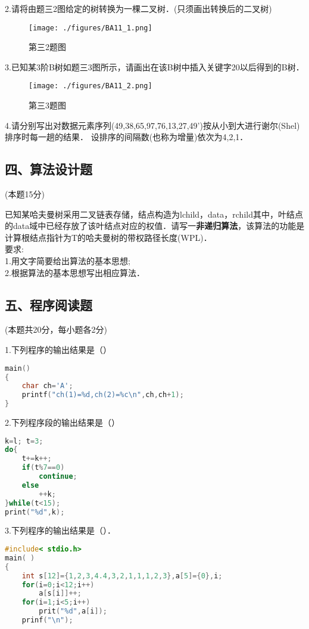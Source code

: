 2.请将由题三2图给定的树转换为一棵二叉树．(只须画出转换后的二叉树)
\begin{figure}[ht]
\centering
\texttt{[image: ./figures/BA11\_1.png]}
\caption{第三2题图} \label{BA11_fig1}
\end{figure}

3.已知某3阶B树如题三3图所示，请画出在该B树中插入关键字20以后得到的B树．
\begin{figure}[ht]
\centering
\texttt{[image: ./figures/BA11\_2.png]}
\caption{第三3题图} \label{BA11_fig2}
\end{figure}

4.请分别写出对数据元素序列(49,38,65,97,76,13,27,49')按从小到大进行谢尔(Shel)排序时每一趟的结果． 设排序的间隔数(也称为增量)依次为4,2,1．

\subsection{四、算法设计题}
(本题15分)

已知某哈夫曼树采用二叉链表存储，结点构造为lchild，data，rchild其中，叶结点的data域中已经存放了该叶结点对应的权值．请写一\textbf{非递归算法}，该算法的功能是计算根结点指针为T的哈夫曼树的带权路径长度(WPL)． \\
要求: \\
1.用文字简要给出算法的基本思想; \\
2.根据算法的基本思想写出相应算法．

\subsection{五、程序阅读题}

(本题共20分，每小题各2分)

1.下列程序的输出结果是（） \\
\begin{lstlisting}[language=cpp]
main()
{
    char ch='A';
    printf("ch(1)=%d,ch(2)=%c\n",ch,ch+1);
}
\end{lstlisting}

2.下列程序段的输出结果是（）
\begin{lstlisting}[language=cpp]
k=l; t=3;
do{
    t+=k++;
    if(t%7==0)
        continue;
    else
        ++k;
}while(t<15);
print("%d",k);
\end{lstlisting}

3.下列程序的输出结果是（）．
\begin{lstlisting}[language=cpp]
#include< stdio.h>
main( )
{
    int s[12]={1,2,3,4.4,3,2,1,1,1,2,3},a[5]={0},i;
    for(i=0;i<12;i++)
        a[s[i]]++;
    for(i=1;i<5;i++)
        prit("%d",a[i]);
    prinf("\n");
\end{lstlisting}


